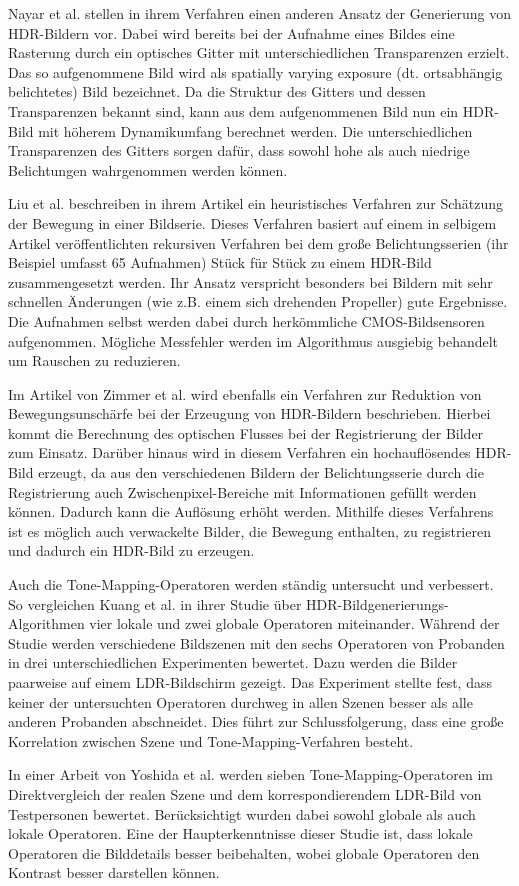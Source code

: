 Nayar et al. \cite{Nayar00highdynamic} stellen in ihrem Verfahren einen anderen Ansatz der Generierung von \gls{HDR}-Bildern vor. Dabei wird bereits bei der Aufnahme eines Bildes eine Rasterung durch ein optisches Gitter mit unterschiedlichen Transparenzen erzielt. Das so aufgenommene Bild wird als spatially varying exposure (dt. ortsabhängig belichtetes) Bild bezeichnet. Da die Struktur des Gitters und dessen Transparenzen bekannt sind, kann aus dem aufgenommenen Bild nun ein \gls{HDR}-Bild mit höherem Dynamikumfang berechnet werden. Die unterschiedlichen Transparenzen des Gitters sorgen dafür, dass sowohl hohe als auch niedrige Belichtungen wahrgenommen werden können. 

Liu et al. \cite{Xinqiao} beschreiben in ihrem Artikel ein heuristisches Verfahren zur Schätzung der Bewegung in einer Bildserie. Dieses Verfahren basiert auf einem in selbigem Artikel veröffentlichten rekursiven Verfahren bei dem große Belichtungsserien (ihr Beispiel umfasst 65 Aufnahmen) Stück für Stück zu einem \gls{HDR}-Bild zusammengesetzt werden. Ihr Ansatz verspricht besonders bei Bildern mit sehr schnellen Änderungen (wie z.B. einem sich drehenden Propeller) gute Ergebnisse. Die Aufnahmen selbst werden dabei durch herkömmliche \gls{CMOS}-Bildsensoren aufgenommen. Mögliche Messfehler werden im Algorithmus ausgiebig behandelt um Rauschen zu reduzieren.

Im Artikel von Zimmer et al. \cite{zimmer} wird ebenfalls ein Verfahren zur Reduktion von Bewegungsunschärfe bei der Erzeugung von \gls{HDR}-Bildern beschrieben. Hierbei kommt die Berechnung des optischen Flusses bei der Registrierung der Bilder zum Einsatz. Darüber hinaus wird in diesem Verfahren ein hochauflösendes \gls{HDR}-Bild erzeugt, da aus den verschiedenen Bildern der Belichtungsserie durch die Registrierung auch Zwischenpixel-Bereiche mit Informationen gefüllt werden können. Dadurch kann die Auflösung erhöht werden. Mithilfe dieses Verfahrens ist es möglich auch verwackelte Bilder, die Bewegung enthalten, zu registrieren und dadurch ein \gls{HDR}-Bild zu erzeugen.

Auch die \gls{Tone-Mapping}-Operatoren werden ständig untersucht und verbessert. So vergleichen Kuang et al. \cite{tone_mapper_2} in ihrer Studie über \gls{HDR}-Bildgenerierungs-Algorithmen vier lokale und zwei globale Operatoren miteinander. Während der Studie werden verschiedene Bildszenen mit den sechs Operatoren von Probanden in drei unterschiedlichen Experimenten bewertet. Dazu werden die Bilder paarweise auf einem \gls{LDR}-Bildschirm gezeigt. Das Experiment stellte fest, dass keiner der untersuchten Operatoren durchweg in allen Szenen besser als alle anderen Probanden abschneidet. Dies führt zur Schlussfolgerung, dass eine große Korrelation zwischen Szene und \gls{Tone-Mapping}-Verfahren besteht. 

In einer Arbeit von Yoshida et al. \cite{tone_mapper_1} werden sieben \gls{Tone-Mapping}-Operatoren im Direktvergleich der realen Szene und dem korrespondierendem \gls{LDR}-Bild von Testpersonen bewertet. Berücksichtigt wurden dabei sowohl globale als auch lokale Operatoren. Eine der Haupterkenntnisse dieser Studie ist, dass lokale Operatoren die Bilddetails besser beibehalten, wobei globale Operatoren den Kontrast besser darstellen können.

